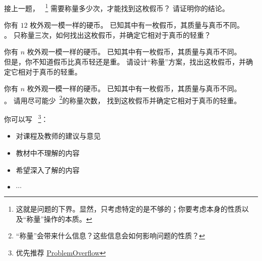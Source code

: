 \documentclass[a4paper, justified]{tufte-handout}
\begin{document}
\begin{solution}
\end{solution}

\begin{problem}[$n$ 枚硬币问题的下界]
  接上一题，
  ~\footnote{这就是问题的下界。显然，只考虑特定的是不够的；你要考虑本身的性质以及``称量''操作的本质。}
  需要称量多少次，才能找到这枚假币？
  请证明你的结论。
\end{problem}

\begin{solution}
\end{solution}

\begin{problem}
  你有 $12$ 枚外观一模一样的硬币。
  已知其中有一枚假币，其质量与真币不同。\\
  。
  只称量三次，如何找出这枚假币，并确定它相对于真币的轻重？

\end{problem}

\begin{solution}%
\end{solution}

\beginoptional
\begin{problem}[$n$ 枚硬币]
  你有 $n$ 枚外观一模一样的硬币。
  已知其中有一枚假币，其质量与真币不同。\\
  但是，你不知道假币比真币轻还是重。
  请设计``称量''方案，找出这枚假币，并确定它相对于真币的轻重。
\end{problem}

\begin{solution}
\end{solution}
\begin{problem}[\ot{} $n$ 枚硬币]
  你有 $n$ 枚外观一模一样的硬币。
  已知其中有一枚假币，其质量与真币不同。\\
  。
  请用尽可能少~\footnote{``称量''会带来什么信息？这些信息会如何影响问题的性质？}的称量次数，
  找到这枚假币并确定它相对于真币的轻重。
\end{problem}

\begin{solution}
\end{solution}
\beginfb

你可以写
~\footnote{优先推荐 \href{http://39.100.120.199}{ProblemOverflow}}：
\begin{itemize}
  \item 对课程及教师的建议与意见
  \item 教材中不理解的内容
  \item 希望深入了解的内容
  \item $\cdots$
\end{itemize}
\end{document}
